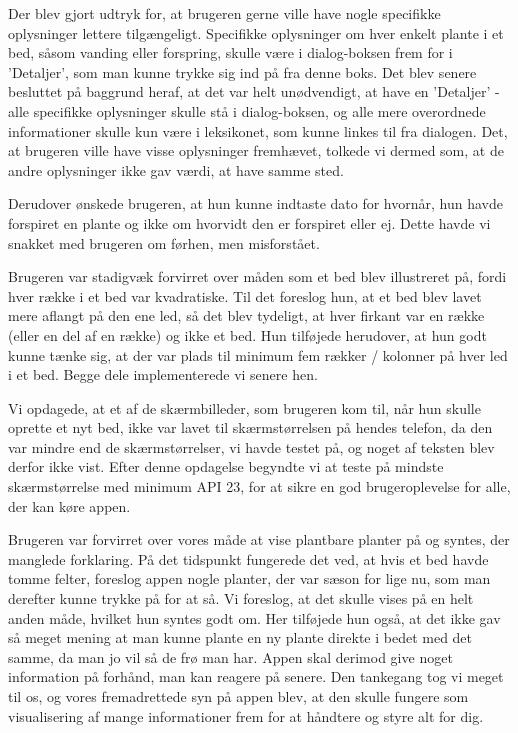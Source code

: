 Der blev gjort udtryk for, at brugeren gerne ville have nogle specifikke oplysninger lettere tilgængeligt. Specifikke oplysninger om hver enkelt plante i et bed, såsom vanding eller forspring, skulle være i dialog-boksen frem for i 'Detaljer', som man kunne trykke sig ind på fra denne boks. Det blev senere besluttet på baggrund heraf, at det var helt unødvendigt, at have en 'Detaljer' - alle specifikke oplysninger skulle stå i dialog-boksen, og alle mere overordnede informationer skulle kun være i leksikonet, som kunne linkes til fra dialogen. Det, at brugeren ville have visse oplysninger fremhævet, tolkede vi dermed som, at de andre oplysninger ikke gav værdi, at have samme sted.

Derudover ønskede brugeren, at hun kunne indtaste dato for hvornår, hun havde forspiret en plante og ikke om hvorvidt den er forspiret eller ej. Dette havde vi snakket med brugeren om førhen, men misforstået.

Brugeren var stadigvæk forvirret over måden som et bed blev illustreret på, fordi hver række i et bed var kvadratiske. Til det foreslog hun, at et bed blev lavet mere aflangt på den ene led, så det blev tydeligt, at hver firkant var en række (eller en del af en række) og ikke et bed. Hun tilføjede herudover, at hun godt kunne tænke sig, at der var plads til minimum fem rækker / kolonner på hver led i et bed. Begge dele implementerede vi senere hen.

Vi opdagede, at et af de skærmbilleder, som brugeren kom til, når hun skulle oprette et nyt bed, ikke var lavet til skærmstørrelsen på hendes telefon, da den var mindre end de skærmstørrelser, vi havde testet på, og noget af teksten blev derfor ikke vist. Efter denne opdagelse begyndte vi at teste på mindste skærmstørrelse med minimum API 23, for at sikre en god brugeroplevelse for alle, der kan køre appen.

Brugeren var forvirret over vores måde at vise plantbare planter på og syntes, der manglede forklaring. På det tidspunkt fungerede det ved, at hvis et bed havde tomme felter, foreslog appen nogle planter, der var sæson for lige nu, som man derefter kunne trykke på for at så. Vi foreslog, at det skulle vises på en helt anden måde, hvilket hun syntes godt om. Her tilføjede hun også, at det ikke gav så meget mening at man kunne plante en ny plante direkte i bedet med det samme, da man jo vil så de frø man har. Appen skal derimod give noget information på forhånd, man kan reagere på senere. Den tankegang tog vi meget til os, og vores fremadrettede syn på appen blev, at den skulle fungere som visualisering af mange informationer frem for at håndtere og styre alt for dig.


